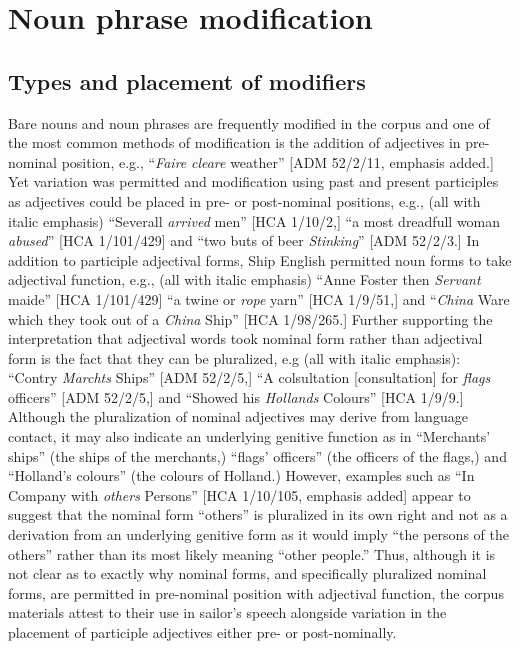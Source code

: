 \section{\textbf{Noun} \textbf{phrase} \textbf{modification} }%

\subsection{\textbf{Types} \textbf{and} \textbf{placement} \textbf{of} \textbf{modifiers}}%

  Bare nouns and noun phrases are frequently modified in the corpus and one of the most common methods of modification is the addition of adjectives in pre-nominal position, e.g., “\textit{Faire} \textit{cleare} weather” [ADM 52/2/11, emphasis added.] Yet variation was permitted and modification using past and present participles as adjectives could be placed in pre- or post-nominal positions, e.g., (all with italic emphasis) “Severall \textit{arrived} men” [HCA 1/10/2,] “a most dreadfull woman \textit{abused}” [HCA 1/101/429] and “two buts of beer \textit{Stinking}” [ADM 52/2/3.]  In addition to participle adjectival forms, Ship English permitted noun forms to take adjectival function, e.g., (all with italic emphasis) “Anne Foster then \textit{Servant} maide” [HCA 1/101/429] “a twine or \textit{rope} yarn” [HCA 1/9/51,] and “\textit{China} Ware which they took out of a \textit{China} Ship” [HCA 1/98/265.] Further supporting the interpretation that adjectival words took nominal form rather than adjectival form is the fact that they can be pluralized, e.g (all with italic emphasis): “Contry \textit{Marchts} Ships” [ADM 52/2/5,] “A colsultation [consultation] for \textit{flags} officers” [ADM 52/2/5,] and “Showed his \textit{Hollands} Colours” [HCA 1/9/9.] Although the pluralization of nominal adjectives may derive from language contact, it may also indicate an underlying genitive function as in “Merchants’ ships” (the ships of the merchants,) “flags’ officers” (the officers of the flags,) and “Holland’s colours” (the colours of Holland.) However, examples such as “In Company with \textit{others} Persons” [HCA 1/10/105, emphasis added] appear to suggest that the nominal form “others” is pluralized in its own right and not as a derivation from an underlying genitive form as it would imply “the persons of the others” rather than its most likely meaning “other people.” Thus, although it is not clear as to exactly why nominal forms, and specifically pluralized nominal forms, are permitted in pre-nominal position with adjectival function, the corpus materials attest to their use in sailor’s speech alongside variation in the placement of participle adjectives either pre- or post-nominally. 

